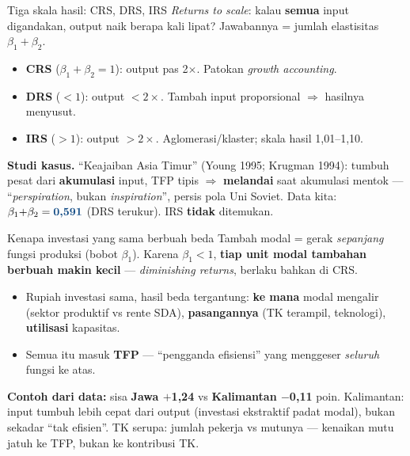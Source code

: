 \documentclass[aspectratio=169,11pt]{beamer}
\newcommand{\naik}[1]{{\color{hijau}\textbf{#1}}}
\newcommand{\turun}[1]{{\color{merah}\textbf{#1}}}
\newcommand{\key}[1]{{\color{aksen}\textbf{#1}}}
\begin{document}
\begin{frame}{Tiga skala hasil: CRS, DRS, IRS}
  \emph{Returns to scale}: kalau \textbf{semua} input digandakan, output naik berapa kali lipat?
  Jawabannya = jumlah elastisitas $\beta_1+\beta_2$.
  \vspace{0.5em}
  \begin{itemize}
    \setlength\itemsep{0.5em}
    \item \key{CRS} ($\beta_1{+}\beta_2{=}1$): output pas 2$\times$. Patokan \emph{growth accounting}.
    \item \key{DRS} ($<1$): output $<2\times$. Tambah input proporsional $\Rightarrow$ hasilnya menyusut.
    \item \key{IRS} ($>1$): output $>2\times$. Aglomerasi/klaster; skala hasil 1,01--1,10.
  \end{itemize}
  \vspace{0.5em}
  \textbf{Studi kasus.} ``Keajaiban Asia Timur'' (Young 1995; Krugman 1994): tumbuh pesat dari
  \key{akumulasi} input, TFP tipis $\Rightarrow$ \turun{melandai} saat akumulasi mentok ---
  ``\emph{perspiration}, bukan \emph{inspiration}'', persis pola Uni Soviet.
  \vspace{0.3em}
  {\color{abu}\small Data kita: $\beta_1{+}\beta_2=\key{0{,}591}$ (DRS terukur). IRS \textbf{tidak} ditemukan.}
\end{frame}

\begin{frame}{Kenapa investasi yang sama berbuah beda}
  Tambah modal = gerak \emph{sepanjang} fungsi produksi (bobot $\beta_1$). Karena $\beta_1<1$,
  \key{tiap unit modal tambahan berbuah makin kecil} --- \emph{diminishing returns}, berlaku bahkan di CRS.
  \vspace{0.4em}
  \begin{itemize}
    \setlength\itemsep{0.45em}
    \item Rupiah investasi sama, hasil beda tergantung: \key{ke mana} modal mengalir (sektor
          produktif vs rente SDA), \key{pasangannya} (TK terampil, teknologi), \key{utilisasi} kapasitas.
    \item Semua itu masuk \key{TFP} --- ``pengganda efisiensi'' yang menggeser \emph{seluruh} fungsi ke atas.
  \end{itemize}
  \vspace{0.4em}
  \textbf{Contoh dari data:} sisa \naik{Jawa $+$1,24} vs \turun{Kalimantan $-$0,11} poin. Kalimantan:
  input tumbuh lebih cepat dari output (investasi ekstraktif padat modal), bukan sekadar ``tak efisien''.
  \vspace{0.2em}
  {\color{abu}\small TK serupa: jumlah pekerja vs mutunya --- kenaikan mutu jatuh ke TFP, bukan ke kontribusi TK.}
\end{frame}
\end{document}
